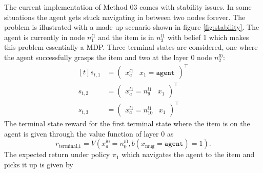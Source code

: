 The current implementation of Method 03 comes with stability issues. In some situations the agent gets stuck navigating in between two nodes forever. The problem is illustrated with a made up scenario shown in figure \ref{fig:stability}. The agent is currently in node $n_1^{l1}$ and the item is in $n_3^{l1}$ with belief 1 which makes this problem essentially a MDP. Three terminal states are considered, one where the agent successfully  grasps the item and two at the layer 0 node $n_2^{l0}$:
\begin{equation}
    \begin{aligned}[t]
        s_{t,1} &= \begin{pmatrix}x_a^{l1} & x_1=\texttt{agent}\end{pmatrix}^\intercal \\
        s_{t,2} &= \begin{pmatrix}x_a^{l1}=n_9^{l1} & x_1\end{pmatrix}^\intercal\\
        s_{t,3} &= \begin{pmatrix}x_a^{l1}=n_{10}^{l1} & x_1\end{pmatrix}^\intercal
    \end{aligned}
\end{equation}
%
The terminal state reward for the first terminal state where the item is on the agent is given through the value function of layer 0 as
\begin{equation}
    r_{\text{terminal,}1} = V\left(x_a^{l0}=n_0^{l0}, b(x_\text{mug}=\texttt{agent})=1\right).    
\end{equation}
The expected return under policy $\pi_1$ which navigates the agent to the item and picks it up is given by

